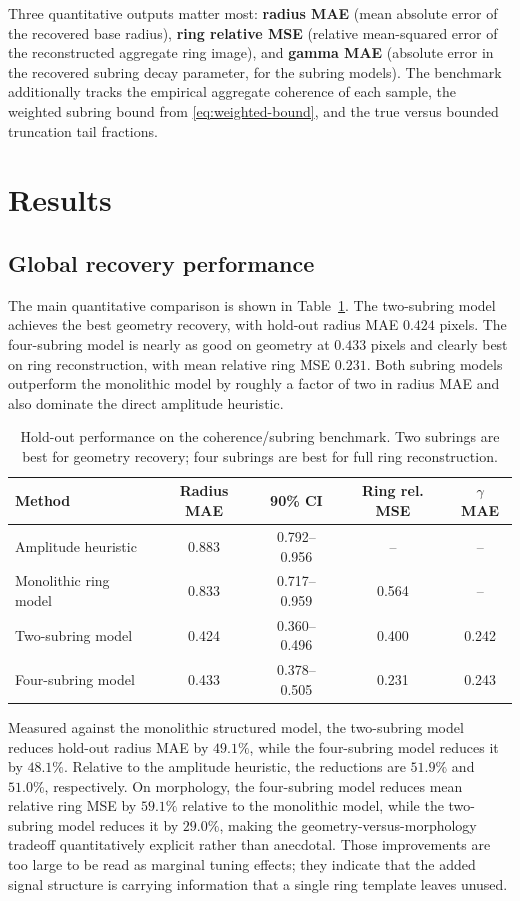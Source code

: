 \documentclass[11pt,a4paper]{article}
\theoremstyle{definition}
\theoremstyle{remark}
\begin{document}
Three quantitative outputs matter most: \textbf{radius MAE} (mean absolute error of the recovered base radius), \textbf{ring relative MSE} (relative mean-squared error of the reconstructed aggregate ring image), and \textbf{gamma MAE} (absolute error in the recovered subring decay parameter, for the subring models). The benchmark additionally tracks the empirical aggregate coherence of each sample, the weighted subring bound from \eqref{eq:weighted-bound}, and the true versus bounded truncation tail fractions.

\section{Results}

\subsection{Global recovery performance}

The main quantitative comparison is shown in Table~\ref{tab:main-results}. The two-subring model achieves the best geometry recovery, with hold-out radius MAE $0.424$ pixels. The four-subring model is nearly as good on geometry at $0.433$ pixels and clearly best on ring reconstruction, with mean relative ring MSE $0.231$. Both subring models outperform the monolithic model by roughly a factor of two in radius MAE and also dominate the direct amplitude heuristic.

\begin{table}[t]
\centering
\small
\begin{tabular}{lcccc}
\toprule
Method & Radius MAE & 90\% CI & Ring rel. MSE & $\gamma$ MAE \\
\midrule
Amplitude heuristic & 0.883 & 0.792--0.956 & -- & -- \\
Monolithic ring model & 0.833 & 0.717--0.959 & 0.564 & -- \\
Two-subring model & 0.424 & 0.360--0.496 & 0.400 & 0.242 \\
Four-subring model & 0.433 & 0.378--0.505 & 0.231 & 0.243 \\
\bottomrule
\end{tabular}
\caption{Hold-out performance on the coherence/subring benchmark. Two subrings are best for geometry recovery; four subrings are best for full ring reconstruction.}
\label{tab:main-results}
\end{table}

Measured against the monolithic structured model, the two-subring model reduces hold-out radius MAE by $49.1\%$, while the four-subring model reduces it by $48.1\%$. Relative to the amplitude heuristic, the reductions are $51.9\%$ and $51.0\%$, respectively. On morphology, the four-subring model reduces mean relative ring MSE by $59.1\%$ relative to the monolithic model, while the two-subring model reduces it by $29.0\%$, making the geometry-versus-morphology tradeoff quantitatively explicit rather than anecdotal. Those improvements are too large to be read as marginal tuning effects; they indicate that the added signal structure is carrying information that a single ring template leaves unused.
\end{document}
